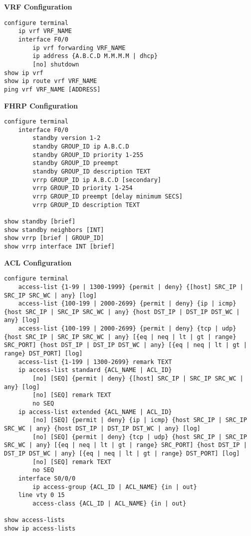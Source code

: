 \documentclass[12pt]{article}
\begin{document}
	\textbf{VRF Configuration}
	\begin{lstlisting}
configure terminal
	ip vrf VRF_NAME
	interface F0/0
		ip vrf forwarding VRF_NAME
		ip address {A.B.C.D M.M.M.M | dhcp}
		[no] shutdown
show ip vrf
show ip route vrf VRF_NAME
ping vrf VRF_NAME [ADDRESS]
	\end{lstlisting}

	\textbf{FHRP Configuration}
	\begin{lstlisting}
configure terminal
	interface F0/0
		standby version 1-2
		standby GROUP_ID ip A.B.C.D
		standby GROUP_ID priority 1-255
		standby GROUP_ID preempt
		standby GROUP_ID description TEXT
		vrrp GROUP_ID ip A.B.C.D [secondary]
		vrrp GROUP_ID priority 1-254
		vrrp GROUP_ID preempt [delay minimum SECS]
		vrrp GROUP_ID description TEXT

show standby [brief]
show standby neighbors [INT]
show vrrp [brief | GROUP_ID]
show vrrp interface INT [brief]
	\end{lstlisting}

	\textbf{ACL Configuration}
	\begin{lstlisting}
configure terminal
	access-list {1-99 | 1300-1999} {permit | deny} {[host] SRC_IP | SRC_IP SRC_WC | any} [log]
	access-list {100-199 | 2000-2699} {permit | deny} {ip | icmp} {host SRC_IP | SRC_IP SRC_WC | any} {host DST_IP | DST_IP DST_WC | any} [log]
	access-list {100-199 | 2000-2699} {permit | deny} {tcp | udp} {host SRC_IP | SRC_IP SRC_WC | any} [{eq | neq | lt | gt | range} SRC_PORT] {host DST_IP | DST_IP DST_WC | any} [{eq | neq | lt | gt | range} DST_PORT] [log]
	access-list {1-199 | 1300-2699} remark TEXT
	ip access-list standard {ACL_NAME | ACL_ID}
		[no] [SEQ] {permit | deny} {[host] SRC_IP | SRC_IP SRC_WC | any} [log]
		[no] [SEQ] remark TEXT
		no SEQ
	ip access-list extended {ACL_NAME | ACL_ID}
		[no] [SEQ] {permit | deny} {ip | icmp} {host SRC_IP | SRC_IP SRC_WC | any} {host DST_IP | DST_IP DST_WC | any} [log]
		[no] [SEQ] {permit | deny} {tcp | udp} {host SRC_IP | SRC_IP SRC_WC | any} [{eq | neq | lt | gt | range} SRC_PORT] {host DST_IP | DST_IP DST_WC | any} [{eq | neq | lt | gt | range} DST_PORT] [log]
		[no] [SEQ] remark TEXT
		no SEQ
	interface S0/0/0
		ip access-group {ACL_ID | ACL_NAME} {in | out}
	line vty 0 15
		access-class {ACL_ID | ACL_NAME} {in | out}

show access-lists
show ip access-lists
	\end{lstlisting}
\end{document}
